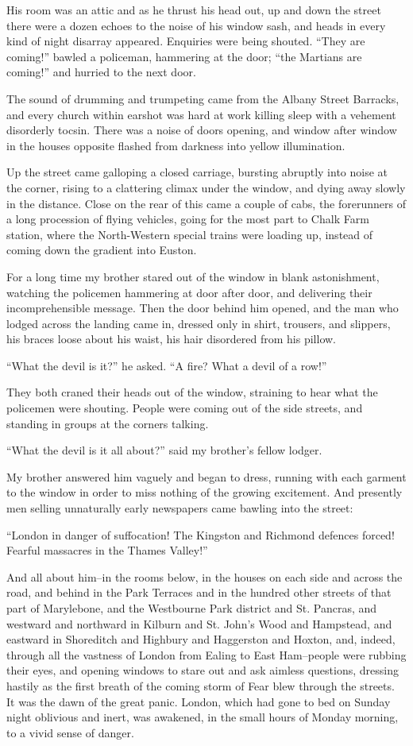His room was an attic and as he thrust his head out, up and down
the street there were a dozen echoes to the noise of his window
sash, and heads in every kind of night disarray appeared. Enquiries
were being shouted. ``They are coming!'' bawled a policeman,
hammering at the door; ``the Martians are coming!'' and hurried to
the next door.

The sound of drumming and trumpeting came from the Albany Street
Barracks, and every church within earshot was hard at work killing
sleep with a vehement disorderly tocsin. There was a noise of doors
opening, and window after window in the houses opposite flashed
from darkness into yellow illumination.

Up the street came galloping a closed carriage, bursting abruptly
into noise at the corner, rising to a clattering climax under the
window, and dying away slowly in the distance. Close on the rear of
this came a couple of cabs, the forerunners of a long procession of
flying vehicles, going for the most part to Chalk Farm station,
where the North-Western special trains were loading up, instead of
coming down the gradient into Euston.

For a long time my brother stared out of the window in blank
astonishment, watching the policemen hammering at door after door,
and delivering their incomprehensible message. Then the door behind
him opened, and the man who lodged across the landing came in,
dressed only in shirt, trousers, and slippers, his braces loose
about his waist, his hair disordered from his pillow.

``What the devil is it?'' he asked. ``A fire? What a devil of a row!''

They both craned their heads out of the window, straining to hear
what the policemen were shouting. People were coming out of the
side streets, and standing in groups at the corners talking.

``What the devil is it all about?'' said my brother's fellow lodger.

My brother answered him vaguely and began to dress, running with
each garment to the window in order to miss nothing of the growing
excitement. And presently men selling unnaturally early newspapers
came bawling into the street:

``London in danger of suffocation! The Kingston and Richmond
defences forced! Fearful massacres in the Thames Valley!''

And all about him--in the rooms below, in the houses on each side
and across the road, and behind in the Park Terraces and in the
hundred other streets of that part of Marylebone, and the
Westbourne Park district and St. Pancras, and westward and
northward in Kilburn and St. John's Wood and Hampstead, and
eastward in Shoreditch and Highbury and Haggerston and Hoxton, and,
indeed, through all the vastness of London from Ealing to East
Ham--people were rubbing their eyes, and opening windows to stare
out and ask aimless questions, dressing hastily as the first breath
of the coming storm of Fear blew through the streets. It was the
dawn of the great panic. London, which had gone to bed on Sunday
night oblivious and inert, was awakened, in the small hours of
Monday morning, to a vivid sense of danger.

